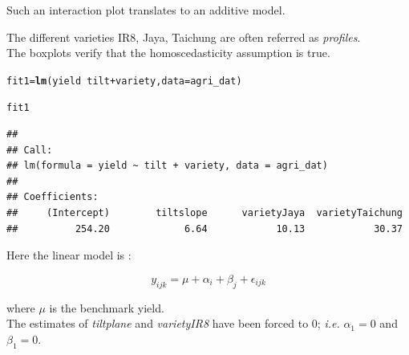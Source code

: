 \documentclass[11pt, a4paper]{article}\usepackage[]{graphicx}\usepackage[dvipsnames]{xcolor}
\makeatletter
\newcommand{\hlopt}[1]{\textcolor[rgb]{0,0,0}{#1}}%
\newcommand{\hlstd}[1]{\textcolor[rgb]{0.345,0.345,0.345}{#1}}%
\newcommand{\hlkwb}[1]{\textcolor[rgb]{0.69,0.353,0.396}{#1}}%
\newcommand{\hlkwc}[1]{\textcolor[rgb]{0.333,0.667,0.333}{#1}}%
\newcommand{\hlkwd}[1]{\textcolor[rgb]{0.737,0.353,0.396}{\textbf{#1}}}%
\newenvironment{kframe}{%
 \def\at@end@of@kframe{}%
 \ifinner\ifhmode%
  \def\at@end@of@kframe{\end{minipage}}%
  \begin{minipage}{\columnwidth}%
 \fi\fi%
 \def\FrameCommand##1{\hskip\@totalleftmargin \hskip-\fboxsep
 \colorbox{shadecolor}{##1}\hskip-\fboxsep
     \hskip-\linewidth \hskip-\@totalleftmargin \hskip\columnwidth}%
 \MakeFramed {\advance\hsize-\width
   \@totalleftmargin\z@ \linewidth\hsize
   \@setminipage}}%
 {\par\unskip\endMakeFramed%
 \at@end@of@kframe}
\newenvironment{knitrout}{}{} %
\makeatother
\begin{document}
Such an interaction plot translates to an additive model.

The different varieties IR8, Jaya, Taichung are often referred as \textit{profiles}. \\

The boxplots verify that the homoscedasticity assumption is true.

\begin{knitrout}
\color{fgcolor}\begin{kframe}
\begin{alltt}
\hlstd{fit1} \hlkwb{=} \hlkwd{lm}\hlstd{(yield} \hlopt{~} \hlstd{tilt} \hlopt{+} \hlstd{variety,} \hlkwc{data} \hlstd{= agri_dat)}
\end{alltt}
\end{kframe}
\end{knitrout}

\begin{knitrout}
\color{fgcolor}\begin{kframe}
\begin{alltt}
\hlstd{fit1}
\end{alltt}
\begin{verbatim}
## 
## Call:
## lm(formula = yield ~ tilt + variety, data = agri_dat)
## 
## Coefficients:
##     (Intercept)        tiltslope      varietyJaya  varietyTaichung  
##          254.20             6.64            10.13            30.37
\end{verbatim}
\end{kframe}
\end{knitrout}

Here the linear model is :

$$y_{ijk} = \mu + \alpha_i + \beta_j + \epsilon_{ijk}$$

where $\mu$ is the benchmark yield. \\

The estimates of \textit{tiltplane} and \textit{varietyIR8} have been forced to 0; \textit{i.e.} 
$\alpha_1 = 0$ and $\beta_1 = 0$.
\end{document}
